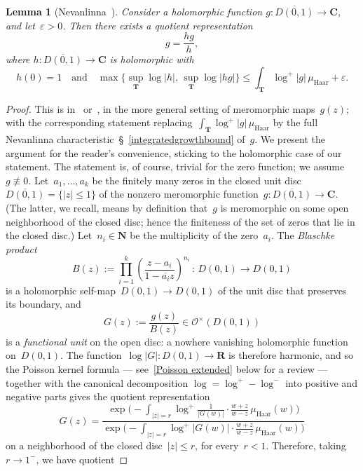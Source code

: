 \documentclass[10pt]{amsart}
\def\NwithzeroB{\mathbf{N}}
\def\NwithzeroA{\NwithzeroB}
\def\SSS{\S}
\def\T{\mathbf{T}}
\def\R{\mathbf{R}}
\newtheorem{lemma}[subsubsection]{Lemma}
\theoremstyle{remark}
\numberwithin{equation}{subsection}
\def\C{\mathbf{C}}
\begin{document}
\begin{lemma}[Nevanlinna~\cite{Nevanlinna}]  \label{Beurling Nevanlinna}
Consider a holomorphic function $g : \overline{D(0,1)} \to \C$, and let~$\varepsilon > 0$.  Then there exists a quotient representation
$$
g = \frac{hg}{h},
$$
where $h : \overline{D(0,1)} \to \C$ is holomorphic with
$$
h(0) = 1 \quad \textrm{and}  \quad 
\max \big\{ \sup_{\T} \log{|h|}, \, \sup_{\T} \log{|hg|} \big\} \leq \int_{\T} \log^+{|g|} \, \mu_{\mathrm{Haar}} + \varepsilon.
$$
\end{lemma}

\begin{proof} 
This is in~\cite[\SSS~VII.1.4, Theorem on p.~187]{Nevanlinna} or~\cite[\SSS~VII.5]{Goluzin}, in the more general setting of meromorphic maps~$g(z)$; with the corresponding statement replacing~$\int_{\T} \log^+{|g|} \, \mu_{\mathrm{Haar}}$ by the full Nevanlinna characteristic~\S~\ref{integratedgrowthbound} of~$g$. We present the
argument for the reader's convenience, sticking to the holomorphic case of our statement. 
The statement is, of course, trivial for the zero function; we assume~$g \not\equiv 0$.  
Let~$a_1, \ldots, a_k$ be the finitely many zeros in the closed unit disc   $\overline{D(0,1)} = \{ |z| \leq 1 \}$
of the nonzero meromorphic function~$g : \overline{D(0,1)} \to \C$. (The latter, we recall, means by definition that~$g$ is meromorphic on some open neighborhood of the closed disc; hence the finiteness of the set of zeros that lie in the closed disc.) Let~$n_i \in \NwithzeroA$ be the multiplicity of the zero~$a_i$. The \emph{Blaschke product}
$$
B(z) := \prod_{i=1}^{k} \left( \frac{z - a_i}{ 1 - \overline{a_i} z}  \right)^{n_i} \, : \, D(0,1) \to D(0,1)
$$
is a holomorphic self-map~$D(0,1) \to D(0,1)$ of the unit disc that preserves its boundary, and
$$
G(z) := \frac{g(z)}{B(z)} \in \mathcal{O}^{\times}(D(0,1))
$$
 is a \emph{functional unit} on the open disc: a 
nowhere vanishing holomorphic function on~$D(0,1)$.   The function~$\log{|G|} : D(0,1) \to \R$ 
is therefore harmonic, and so the Poisson kernel formula --- see~\eqref{Poisson extended} below for a review --- together with the canonical decomposition $\log = \log^+ - \log^-$ into positive and negative parts gives the quotient representation
$$
G(z) = \frac{  \exp \Big(  -  \int_{|z|=r} \log^+{ \frac{1}{|G(w)|} } \cdot \frac{w+z}{w-z} \, \mu_{\mathrm{Haar}}(w) \Big) }{
 \exp \Big(  -  \int_{|z|=r} \log^+{ |G(w)| } \cdot \frac{w+z}{w-z}  \, \mu_{\mathrm{Haar}}(w) \Big) }
 $$
 on a neighborhood of the closed disc~$|z| \leq r$, for every~$r < 1$. Therefore, taking~$r \to 1^-$, we have quotient

\end{proof}
\end{document}
